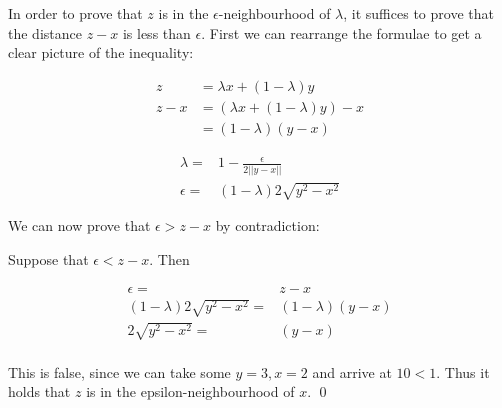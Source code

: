 In order to prove that $z$ is in the $\epsilon$-neighbourhood of $\lambda$, it suffices to prove that the distance $z - x$ is less than $\epsilon$. First we can rearrange the formulae to get a clear picture of the inequality:

\begin{align*}
  z&=\lambda x + (1-\lambda)y\\
  z - x&=(\lambda x + (1 - \lambda)y) - x\\
  &=(1-\lambda)(y-x)
\end{align*}

\begin{align*}
  \lambda =& 1 - \frac{\epsilon}{2||y - x||}\\
  \epsilon =& (1-\lambda)2\sqrt{y^2 - x^2}
\end{align*}

We can now prove that $\epsilon > z - x$ by contradiction:

Suppose that $\epsilon < z - x$. Then

\begin{align*}
  \epsilon =& z - x\\
  (1-\lambda)2\sqrt{y^2 - x^2} =& (1-\lambda)(y-x)\\
  2\sqrt{y^2 - x^2} =& (y-x)\\
\end{align*}

This is false, since we can take some $y = 3, x = 2$ and arrive at $10 < 1$. Thus it holds that $z$ is in the epsilon-neighbourhood of $x$. \qed
